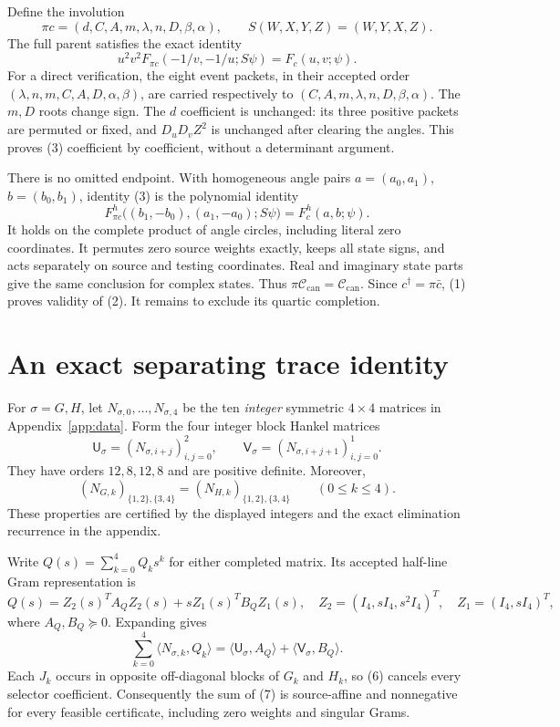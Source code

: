 \documentclass[10pt]{article}
\newcommand{\Cc}{\mathcal C_{\mathrm{can}}}
\newcommand{\ip}[2]{\langle #1,#2\rangle}
\begin{document}
Define the involution
\[
 \pi c=(d,C,A,m,\lambda,n,D,\beta,\alpha),\qquad
 S(W,X,Y,Z)=(W,Y,X,Z).
\]
The full parent satisfies the exact identity
\[
 \boxed{u^2v^2F_{\pi c}(-1/v,-1/u;S\psi)=F_c(u,v;\psi).} \tag{3}
\]
For a direct verification, the eight event packets, in their accepted
order $(\lambda,n,m,C,A,D,\alpha,\beta)$, are carried respectively to
$(C,A,m,\lambda,n,D,\beta,\alpha)$. The $m,D$ roots change sign.
The $d$ coefficient is unchanged: its three positive packets are permuted
or fixed, and $D_uD_vZ^2$ is unchanged after clearing the angles.
This proves (3) coefficient by coefficient, without a determinant argument.

There is no omitted endpoint. With homogeneous angle pairs
$a=(a_0,a_1)$, $b=(b_0,b_1)$, identity (3) is the polynomial identity
\[
 \boxed{F^h_{\pi c}\bigl((b_1,-b_0),(a_1,-a_0);S\psi\bigr)
                       =F^h_c(a,b;\psi).}                 \tag{4}
\]
It holds on the complete product of angle circles, including literal zero
coordinates. It permutes zero source weights exactly, keeps all state
signs, and acts separately on source and testing coordinates. Real and
imaginary state parts give the same conclusion for complex states.
Thus $\pi\Cc=\Cc$. Since $c^\dagger=\pi\bar c$, (1) proves validity
of (2). It remains to exclude its quartic completion.

\section{An exact separating trace identity}

For $\sigma=G,H$, let $N_{\sigma,0},\ldots,N_{\sigma,4}$ be the ten
\emph{integer} symmetric $4\times4$ matrices in Appendix~\ref{app:data}.
Form the four integer block Hankel matrices
\[
 \mathsf U_\sigma=(N_{\sigma,i+j})_{i,j=0}^{2},\qquad
 \mathsf V_\sigma=(N_{\sigma,i+j+1})_{i,j=0}^{1}.           \tag{5}
\]
They have orders $12,8,12,8$ and are positive definite. Moreover,
\[
 (N_{G,k})_{\{1,2\},\{3,4\}}
 =(N_{H,k})_{\{1,2\},\{3,4\}}
 \qquad(0\le k\le4).                                    \tag{6}
\]
These properties are certified by the displayed integers and the exact
elimination recurrence in the appendix.

Write $Q(s)=\sum_{k=0}^4Q_ks^k$ for either completed matrix. Its accepted
half-line Gram representation is
\[
 Q(s)=Z_2(s)^TA_QZ_2(s)+sZ_1(s)^TB_QZ_1(s),\quad
 Z_2=(I_4,sI_4,s^2I_4)^T,\quad Z_1=(I_4,sI_4)^T,
\]
where $A_Q,B_Q\succeq0$. Expanding gives
\[
 \sum_{k=0}^4\ip{N_{\sigma,k}}{Q_k}
 =\ip{\mathsf U_\sigma}{A_Q}+\ip{\mathsf V_\sigma}{B_Q}.
                                                               \tag{7}
\]
Each $J_k$ occurs in opposite off-diagonal blocks of $G_k$ and $H_k$,
so (6) cancels every selector coefficient. Consequently the sum of (7)
is source-affine and nonnegative for every feasible certificate, including
zero weights and singular Grams.
\end{document}
